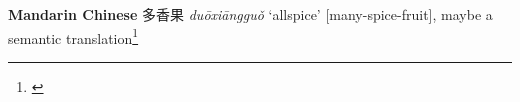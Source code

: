 \begin{etymology}\label{ety:duoxiangguo}
\textbf{Mandarin Chinese} {多香果} \textit{duōxiāngguǒ} `allspice' [many-spice-fruit], maybe a semantic translation\footnote{\textcite{mdbg}}
\end{etymology}